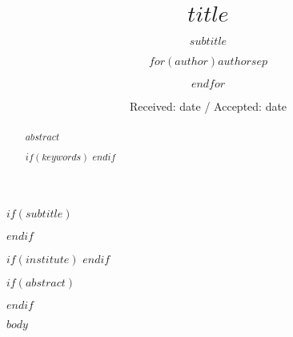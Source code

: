 \documentclass{scrartcl}
\begin{document}
\title{$title$}
$if(subtitle)$
\subtitle{$subtitle$}
$endif$

\author{$for(author)$$author$$sep$ \and $endfor$}


$if(institute)$
$endif$


\date{Received: date / Accepted: date}

\maketitle

$if(abstract)$
\begin{abstract}
$abstract$

$if(keywords)$
$endif$
\end{abstract}
$endif$

$body$

\printbibliography
\end{document}

